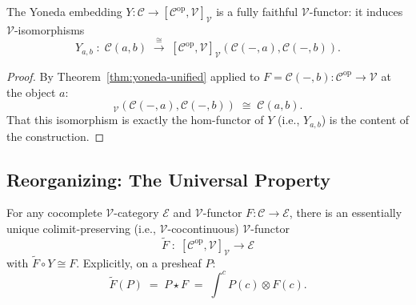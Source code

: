 \begin{theorem}
\label{thm:yoneda-ff}
The Yoneda embedding $Y : \mathcal{C} \to [\mathcal{C}^{\mathrm{op}},
\mathcal{V}]_\mathcal{V}$ is a fully faithful $\mathcal{V}$-functor: it
induces $\mathcal{V}$-isomorphisms
\begin{equation*}
  Y_{a, b} \;:\; \mathcal{C}(a, b) \;\xrightarrow{\;\cong\;}\;
  [\mathcal{C}^{\mathrm{op}}, \mathcal{V}]_\mathcal{V}(\mathcal{C}(-, a), \mathcal{C}(-, b)).
\end{equation*}
\end{theorem}

\begin{proof}
By Theorem~\ref{thm:yoneda-unified} applied to $F = \mathcal{C}(-, b) :
\mathcal{C}^{\mathrm{op}} \to \mathcal{V}$ at the object $a$:
\begin{equation*}
  [\mathcal{C}^{\mathrm{op}}, \mathcal{V}]_\mathcal{V}(\mathcal{C}(-, a), \mathcal{C}(-, b))
  \;\cong\; \mathcal{C}(a, b).
\end{equation*}
That this isomorphism is exactly the hom-functor of $Y$ (i.e., $Y_{a,b}$) is
the content of the construction.
\end{proof}

\subsection{Reorganizing: The Universal Property}

\begin{theorem}
\label{thm:free-cocompletion}
For any cocomplete $\mathcal{V}$-category $\mathcal{E}$ and $\mathcal{V}$-functor
$F : \mathcal{C} \to \mathcal{E}$, there is an essentially unique
colimit-preserving (i.e., $\mathcal{V}$-cocontinuous) $\mathcal{V}$-functor
\begin{equation*}
  \widetilde F \;:\; [\mathcal{C}^{\mathrm{op}}, \mathcal{V}]_\mathcal{V} \to \mathcal{E}
\end{equation*}
with $\widetilde F \circ Y \cong F$. Explicitly, on a presheaf $P$:
\begin{equation*}
  \widetilde F (P) \;=\; P \star F \;=\; \int^c P(c) \otimes F(c).
\end{equation*}
\end{theorem}


